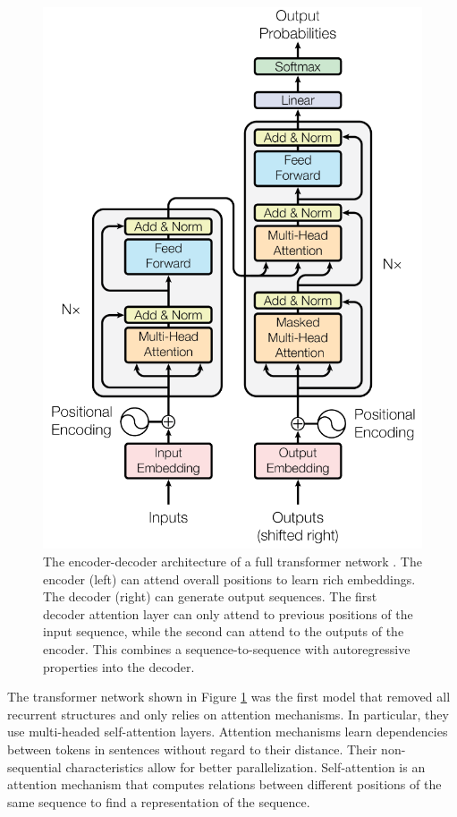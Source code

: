 \documentclass[../main.tex]{subfiles}
\begin{document}
\begin{figure}[t]
    \centering
    \includegraphics[scale=0.4]{include/images/transformer_architecture.png}
    \caption{
        The encoder-decoder architecture
        of a full transformer network \cite{Vaswani2017}.
        The encoder (left) can attend overall positions to learn rich embeddings.
        The decoder (right) can generate output sequences.
        The first decoder attention layer
        can only attend to previous positions of the input sequence,
        while the second can attend to the outputs of the encoder.
        This combines a sequence-to-sequence with
        autoregressive properties into the decoder.
    }
    \label{fig:transformer_arch}
\end{figure}

The transformer network \cite{Vaswani2017}
shown in Figure \ref{fig:transformer_arch}
was the first model that removed all recurrent structures
and only relies on attention mechanisms.
In particular,
they use multi-headed self-attention layers.
Attention mechanisms learn dependencies between tokens in sentences
without regard to their distance.
Their non-sequential characteristics allow for better parallelization.
Self-attention is an attention mechanism
that computes relations between different positions of the same sequence
to find a representation of the sequence.
\end{document}
